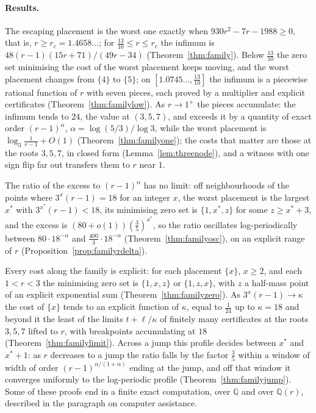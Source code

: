 \documentclass[11pt]{article}
\begin{document}
\paragraph{Results.}  The escaping placement is the worst one exactly when
$930r^2-7r-1988\ge0$, that is, $r\ge r_c=1.4658\ldots$; for
$\tfrac{13}{10}\le r\le r_c$ the infimum is $48(r-1)(15r+71)/(49r-34)$
(Theorem~\ref{thm:family}).  Below $\tfrac{13}{10}$ the zero set minimising the
cost of the worst placement keeps moving, and the worst placement changes
from $\{4\}$ to $\{5\}$; on $[1.0745\ldots,\tfrac{13}{10}]$ the infimum is
a piecewise rational function of $r$ with seven pieces, each proved by a
multiplier and explicit certificates (Theorem~\ref{thm:familylow}).  As
$r\to1^+$ the pieces accumulate: the infimum tends to $24$, the value at
$(3,5,7)$, and exceeds it by a quantity of exact order $(r-1)^\alpha$,
$\alpha=\log(5/3)/\log3$, while the worst placement is
$\log_3\frac1{r-1}+O(1)$ (Theorem~\ref{thm:familyone}); the costs that
matter are those at the roots $3,5,7$, in closed form
(Lemma~\ref{lem:threenode}), and a witness with one sign flip far out
transfers them to $r$ near $1$.

The ratio of the excess to $(r-1)^\alpha$
has no limit: off neighbourhoods of the points where $3^x(r-1)=18$ for an
integer $x$, the worst placement is the largest $x^*$ with
$3^{x^*}(r-1)<18$, its minimising zero set is $\{1,x^*,z\}$ for some
$z\ge x^*+3$, and the excess is $(80+o(1))(\tfrac35)^{x^*}$, so the ratio
oscillates log-periodically between $80\cdot18^{-\alpha}$ and
$\tfrac{400}3\cdot18^{-\alpha}$ (Theorem~\ref{thm:familyosc}), on an
explicit range of $r$ (Proposition~\ref{prop:familyrdelta}).

Every cost along the family is explicit: for each placement $\{x\}$, $x\ge2$,
and each $1<r<3$ the minimising zero set is $\{1,x,z\}$ or $\{1,z,x\}$,
with $z$ a half-mass point of an explicit exponential sum
(Theorem~\ref{thm:familyzero}).  As $3^x(r-1)\to\kappa$ the cost of
$\{x\}$ tends to an explicit function of $\kappa$, equal to
$\tfrac1{24}$ up to $\kappa=18$ and beyond it the least of the limits
$t+\ell/\kappa$ of finitely many certificates at the roots $3,5,7$ lifted
to $r$, with breakpoints accumulating at $18$
(Theorem~\ref{thm:familylimit}).  Across a jump this profile decides
between $x^*$ and $x^*+1$: as $r$ decreases to a jump the ratio falls by
the factor $\tfrac35$ within a window of width of order
$(r-1)^{\alpha/(1+\alpha)}$ ending at the jump, and off that window it
converges uniformly to the log-periodic profile
(Theorem~\ref{thm:familyjump}).  Some of these proofs end in a finite exact
computation, over $\mathbb Q$ and over $\mathbb Q(r)$, described in the
paragraph on computer assistance.
\end{document}
